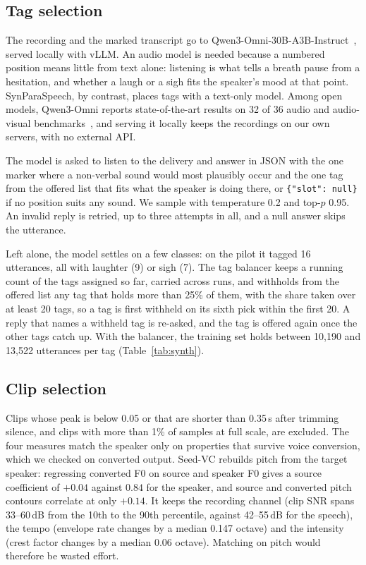 \documentclass{article} %
\begin{document}
\subsection{Tag selection}
The recording and the marked transcript go to Qwen3-Omni-30B-A3B-Instruct~\citep{qwen3omni},
served locally with vLLM. An audio model is needed because a numbered position means little from
text alone: listening is what tells a breath pause from a hesitation, and whether a laugh or a
sigh fits the speaker's mood at that point. SynParaSpeech, by contrast, places tags with a
text-only model. Among open models, Qwen3-Omni reports state-of-the-art results on 32 of 36
audio and audio-visual benchmarks~\citep{qwen3omni}, and serving it locally keeps the recordings
on our own servers, with no external API.

The model is asked to listen to the delivery and answer in JSON with the one marker where a
non-verbal sound would most plausibly occur and the one tag from the offered list that fits what
the speaker is doing there, or \texttt{\{"slot": null\}} if no position suits any sound. We
sample with temperature 0.2 and top-$p$ 0.95. An invalid reply is retried, up to three attempts
in all, and a null answer skips the utterance.

Left alone, the model settles on a few classes: on the pilot it tagged 16 utterances, all with
laughter (9) or sigh (7). The tag balancer keeps a running count of the tags assigned so far,
carried across runs, and withholds from the offered list any tag that holds more than 25\% of
them, with the share taken over at least 20 tags, so a tag is first withheld on its sixth pick
within the first 20. A reply that names a withheld tag is re-asked, and the tag is offered again
once the other tags catch up. With the balancer, the training set holds between 10,190 and
13,522 utterances per tag (Table~\ref{tab:synth}).

\subsection{Clip selection}
Clips whose peak is below 0.05 or that are shorter than 0.35\,s after trimming silence, and
clips with more than 1\% of samples at full scale, are excluded. The four measures match the
speaker only on properties that survive voice conversion, which we checked on converted output.
Seed-VC rebuilds pitch from the target speaker: regressing converted F0 on source and speaker F0
gives a source coefficient of $+0.04$ against $0.84$ for the speaker, and source and converted
pitch contours correlate at only $+0.14$. It keeps the recording channel (clip SNR spans
33--60\,dB from the 10th to the 90th percentile, against 42--55\,dB for the speech), the tempo
(envelope rate changes by a median 0.147 octave) and the intensity (crest factor changes by a
median 0.06 octave). Matching on pitch would therefore be wasted effort.
\end{document}
